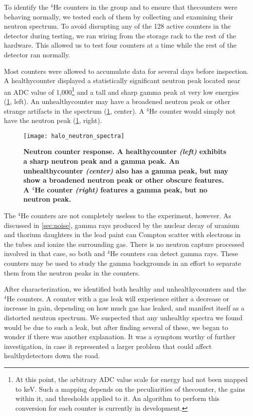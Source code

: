 		To identify the $^4$He counters in the group and to ensure that the{}\he counters were behaving normally, we tested each of them by collecting and examining their neutron spectrum. To avoid disrupting any of the 128 active counters in the detector during testing, we ran wiring from the storage rack to the rest of the hardware. This allowed us to test four counters at a time while the rest of the detector ran normally.

		Most counters were allowed to accumulate data for several days before inspection. A healthy{}\he counter displayed a statistically significant neutron peak located near an ADC value of 1,000\footnote{At this point, the arbitrary ADC value scale for energy had not been mapped to keV. Such a mapping depends on the peculiarities of the{}\he counter, the gains within it, and thresholds applied to it. An algorithm to perform this conversion for each counter is currently in development.} and a tall and sharp gamma peak at very low energies (\FIG \ref{fig:halo_neutron_spectra}, left). An unhealthy{}\he counter may have a broadened neutron peak or other strange artifacts in the spectrum (\FIG \ref{fig:halo_neutron_spectra}, center). A $^4$He counter would simply not have the neutron peak (\FIG \ref{fig:halo_neutron_spectra}, right).
		\begin{figure}[H]
			\texttt{[image: halo\_neutron\_spectra]}
			\caption[Neutron Counter Response]{\bf Neutron counter response. \rm A healthy{}\he counter \emph{(left)} exhibits a sharp neutron peak and a gamma peak. An unhealthy{}\he counter \emph{(center)} also has a gamma peak, but may show a broadened neutron peak or other obscure features. A $^4$He counter \emph{(right)} features a gamma peak, but no neutron peak.}
		\label{fig:halo_neutron_spectra}
		\end{figure}

		The $^4$He counters are not completely useless to the experiment, however. As discussed in \SEC \ref{sec:noise}, gamma rays produced by the nuclear decay of uranium and thorium daughters in the lead paint can Compton scatter with electrons in the tubes and ionize the surrounding gas. There is no neutron capture processed involved in that case, so both \he and $^4$He counters can detect gamma rays. These counters may be used to study the gamma backgrounds in an effort to separate them from the neutron peaks in the \he counters. 

		After characterization, we identified both healthy and unhealthy{}\he counters and the $^4$He counters. A \he counter with a gas leak will experience either a decrease or increase in gain, depending on how much gas has leaked, and manifest itself as a distorted neutron spectrum. We suspected that any unhealthy spectra we found would be due to such a leak, but after finding several of these, we began to wonder if there was another explanation. It was a symptom worthy of further investigation, in case it represented a larger problem that could affect healthy{}\he detectors down the road.


